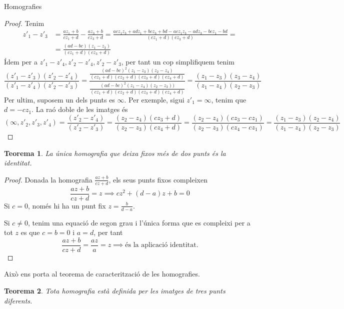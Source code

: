 \documentclass[dvipsnames, svgnames]{article}
\numberwithin{equation}{section}
\newtheorem{theorem}{Teorema}[section]
\theoremstyle{definition}
\theoremstyle{remark}
\begin{document}
\begin{section}{Homografies}
\begin{proof}
        Tenim \begin{align*}
            z'_1-z'_3 &=\frac{az_1+b}{cz_1+d}-\frac{az_3+b}{cz_3+d} = \frac{acz_1z_3+adz_1+bcz_3+bd-acz_1z_3-adz_3-bcz_1-bd}{(cz_1+d)(cz_3+d)} = \\
            &= \frac{(ad-bc)(z_1-z_3)}{(cz_1+d)(cz_3+d)}
        \end{align*}
        Ídem per a $z'_1-z'_4, z'_2-z'_4, z'_2-z'_3$, per tant un cop simplifiquem tenim 
        \begin{displaymath}
            \frac{(z'_1-z'_3)(z'_2-z'_4)}{(z'_1-z'_4)(z'_2-z'_3)}=\frac{\frac{(ad-bc)^2(z_1-z_3)(z_2-z_4)}{(cz_1+d)(cz_2+d)(cz_3+d)(cz_4+d)}}{\frac{(ad-bc)^2(z_1-z_4)(z_2-z_3))}{(cz_1+d)(cz_2+d)(cz_3+d)(cz_4+d)}} = \frac{(z_1-z_3)(z_3-z_4)}{(z_1-z_4)(z_2-z_3)}
        \end{displaymath}
        Per ultim, suposem un dels punts es $\infty$. Per exemple, sigui $z'_1=\infty$, tenim que $d=-cz_1$. La raó doble de les imatges és \begin{displaymath}
            (\infty,z'_2,z'_3,z'_4)=\frac{(z'_2-z'_4)}{(z'_2-z'_3)}=\frac{(z_2-z_4)(cz_3+d)}{(z_2-z_3)(cz_4+d)}=\frac{(z_2-z_4)(cz_3-cz_1)}{(z_2-z_3)(cz_4-cz_1)}=\frac{(z_1-z_3)(z_2-z_4)}{(z_1-z_4)(z_2-z_3)}
        \end{displaymath}
    \end{proof}
    \begin{theorem}
        La única homografia que deixa fixos més de dos punts és la identitat.
    \end{theorem}
    \begin{proof}
        Donada la homografia $\frac{az+b}{cz+d}$, els seus punts fixos compleixen \begin{displaymath}
            \frac{az+b}{cz+d}=z\implies cz^2+(d-a)z+b=0
        \end{displaymath}
        Si $c=0$, només hi ha un punt fix $z=\frac{b}{d-a}$.

        Si $c\neq0$, tenim una equació de segon grau i l'única forma que es compleixi per a tot $z$ es que $c=b=0$ i $a=d$, per tant \begin{displaymath}
            \frac{az+b}{cz+d}=\frac{az}{a}=z\implies \text{és la aplicació identitat.}
        \end{displaymath}
    \end{proof}
    Això ens porta al teorema de caracterització de les homografies.
    \begin{theorem}
        Tota homografia està definida per les imatges de tres punts diferents. 


\end{theorem}
\end{section}
\end{document}
